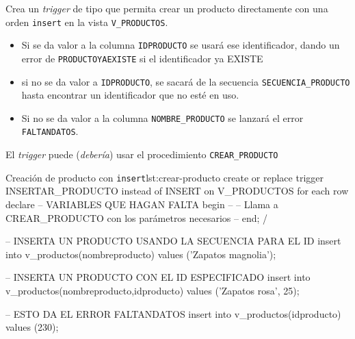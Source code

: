 \begin{homeworkProblem}

  Crea un \textit{trigger} de tipo  que permita crear un producto directamente con una orden \texttt{insert} en la vista \texttt{V\_PRODUCTOS}.
  \begin{itemize}
  \item Si se da valor a la columna \texttt{IDPRODUCTO} se usará ese identificador, dando un error de \texttt{PRODUCTOYAEXISTE} si el identificador ya EXISTE
  \item si no se da valor a \texttt{IDPRODUCTO}, se sacará de la secuencia \texttt{SECUENCIA\_PRODUCTO} hasta encontrar un identificador que no esté en uso.
  \item Si no se da valor a la columna \texttt{NOMBRE\_PRODUCTO} se lanzará el error \texttt{FALTANDATOS}.
  \end{itemize}

  \begin{Aviso}
    El \textit{trigger} puede (\textit{debería}) usar el procedimiento \texttt{CREAR\_PRODUCTO}
  \end{Aviso}
  
  
\begin{listadosql}{Creación de producto con \texttt{insert}}{lst:crear-producto}
create or replace trigger INSERTAR_PRODUCTO
instead of INSERT on V_PRODUCTOS
for each row
declare
  -- VARIABLES QUE HAGAN FALTA
begin
  -- 
  -- Llama a CREAR_PRODUCTO con los parámetros necesarios
  -- 
end;
/


-- INSERTA UN PRODUCTO USANDO LA SECUENCIA PARA EL ID
insert into v_productos(nombreproducto) values ('Zapatos magnolia');

-- INSERTA UN PRODUCTO CON EL ID ESPECIFICADO
insert into v_productos(nombreproducto,idproducto) values ('Zapatos rosa', 25);

-- ESTO DA EL ERROR FALTANDATOS
insert into v_productos(idproducto) values (230);


\end{listadosql}

\end{homeworkProblem}



